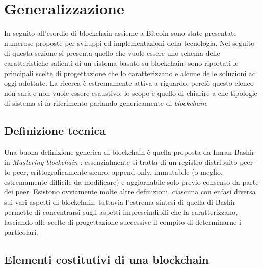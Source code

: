 \section{Generalizzazione}
	In seguito all'esordio di blockchain assieme a Bitcoin sono state presentate numerose proposte per sviluppi ed implementazioni della tecnologia. Nel seguito di questa sezione si presenta quello che vuole essere uno schema delle caratteristiche salienti di un sistema basato su blockchain: sono riportati le principali scelte di progettazione che lo caratterizzano e alcune delle soluzioni ad oggi adottate. La ricerca è estremamente attiva a riguardo, perciò questo elenco non sarà e non vuole essere esaustivo: lo scopo è quello di chiarire a che tipologie di sistema si fa riferimento parlando genericamente di \emph{blockchain}.
	\subsection{Definizione tecnica}
		Una buona definizione generica di blockchain è quella proposta da Imran Bashir in \emph{Mastering blockchain} \cite{mastering_blockchain}: essenzialmente si tratta di un registro distribuito peer-to-peer, crittograficamente sicuro, append-only, immutabile (o meglio, estremamente difficile da modificare) e aggiornabile solo previo consenso da parte dei peer. Esistono ovviamente molte altre definizioni, ciascuna con enfasi diversa sui vari aspetti di blockchain, tuttavia l'estrema sintesi di quella di Bashir permette di concentrarsi sugli aspetti imprescindibili che la caratterizzano, lasciando alle scelte di progettazione successive il compito di determinarne i particolari.
	
	\subsection{Elementi costitutivi di una blockchain}

